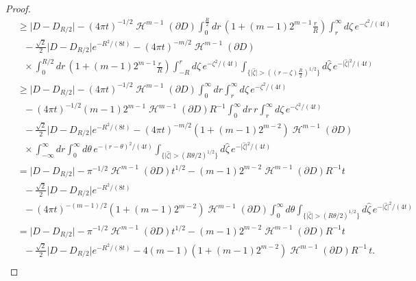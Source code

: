 \documentclass[a4paper,9pt]{amsart}
\begin{document}
\begin{proof}
\begin{align*}
& \geq \big\vert D - D_{R/2} \big \vert - (4\pi
t)^{-1/2}\operatorname{\mathcal{H}}^{m-1}(\partial D)\int_{0}^{\frac{R}{2}}dr \,
\left(1+(m-1)2^{m-1}\frac{r}{R}\right)\int_{r}^{\infty}d\zeta \,
e^{-\zeta^{2}/(4t)}\nonumber \\ &\ \ \ -\frac{\sqrt{2}}{2}
\big\vert D -  D_{R/2} \big\vert e^{-R^{2}/(8t)}-
(4\pi t)^{-m/2}\operatorname{\mathcal{H}}^{m-1}(\partial D)\nonumber \\
&\ \ \  \times\int_{0}^{R/2} dr \,
\left(1+(m-1)2^{m-1}\frac{r}{R}\right) \int_{-R} ^{r}d\zeta \,
e^{-\zeta^{2}/(4t)}\int_{\{\vert \hat{\zeta} \vert > \left((r -
\zeta)\frac{R}{2}\right)^{1/2}\}}
d\hat{\zeta} \, e^{-\vert \hat{\zeta} \vert ^{2}/(4t)}\\
&\geq \big\vert D-D_{R/2} \big \vert - (4\pi
t)^{-1/2}\operatorname{\mathcal{H}}^{m-1}(\partial D)\int_{0}^{\infty}dr
\int_{r}^{\infty}d\zeta \, e^{-\zeta^{2}/(4t)} \\
&\ \ \  - (4\pi t)^{-1/2}(m-1)2^{m-1}\operatorname{\mathcal{H}}^{m-1}(\partial
D)R^{-1}\int_{0}^{\infty}dr \, r \int_{r}^{\infty}d\zeta \,
e^{-\zeta^{2}/(4t)}\nonumber \\ & \ \ \  -\frac{\sqrt{2}}{2}
\big\vert D-D_{R/2} \big\vert e^{-R^{2}/(8t)} - (4\pi
t)^{-m/2}(1+(m-1)2^{m-2})\operatorname{\mathcal{H}}^{m-1}(\partial D)\nonumber
\\ & \ \ \  \times \int_{-\infty}^{\infty} dr \int_{0} ^{\infty}d\theta \,
e^{-(r-\theta)^{2}/(4t)}\int_{\{\vert \hat{\zeta} \vert >
\left(R\theta/2\right)^{1/2}\}}
d\hat{\zeta} \, e^{-\vert \hat{\zeta} \vert ^{2}/(4t)}\\
&= \big\vert D-D_{R/2} \big \vert -\pi^{-1/2} \operatorname{\mathcal{H}}^{m-1}(\partial
D)t^{1/2} -(m-1)2^{m-2} \operatorname{\mathcal{H}}^{m-1}(\partial D)R^{-1}t\nonumber \\
&\ \ \
-\frac{\sqrt{2}}{2} \big\vert D-D_{R/2} \big\vert e^{-R^{2}/(8t)}\\
&\ \ \  - (4\pi t)^{-(m-1)/2}(1+(m-1)2^{m-2})\operatorname{\mathcal{H}}^{m-1}(\partial
D) \int_{0}^{\infty}d\theta \int_{\{\vert \hat{\zeta} \vert >
\left(R\theta/2\right)^{1/2}\}}d\hat{\zeta} \, e^{-\vert
\hat{\zeta} \vert ^{2}/(4t)}\\ &= \big\vert D-D_{R/2} \big \vert -
\pi^{-1/2}\operatorname{\mathcal{H}}^{m-1}(\partial D)t^{1/2} -(m-1)2^{m-2}
\operatorname{\mathcal{H}}^{m-1}(\partial D)R^{-1} t\nonumber
\\ &\ \ \  -\frac{\sqrt{2}}{2} \big\vert D-D_{R/2} \big\vert
e^{-R^{2}/(8t)}
 - 4(m-1)(1+(m-1)2^{m-2})\operatorname{\mathcal{H}}^{m-1}(\partial D)R^{-1} \, t.\\

\end{align*}
\end{proof}
\end{document}
